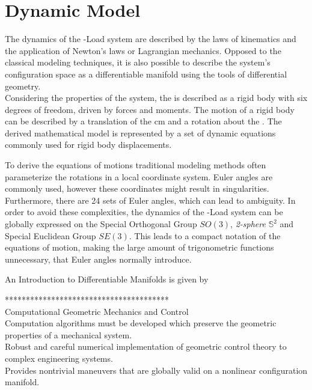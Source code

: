 \chapter{Dynamic Model} \label{ch:model}



The dynamics of the -Load system are described by the laws of kinematics and the application of Newton's laws or Lagrangian mechanics. Opposed to the classical modeling techniques, it is also possible to describe the system's configuration space as a differentiable manifold using the tools of differential geometry. \\

Considering the properties of the system, the  is described as a rigid body with six degrees of freedom, driven by forces and moments. The motion of a rigid body can be described by a translation of the \acf{cm} and a rotation about the . The derived mathematical model is represented by a set of dynamic equations commonly used for rigid body displacements. 

To derive the equations of motions traditional modeling methods often parameterize the rotations in a local coordinate system. Euler angles are commonly used, however these coordinates might result in singularities. Furthermore, there are 24 sets of Euler angles, which can lead to ambiguity. In order to avoid these complexities, the dynamics of the -Load system can be globally expressed on the Special Orthogonal Group $SO(3)$, \textit{2-sphere} $ \mathbb{S}^2 $ and Special Euclidean Group $ SE(3) $. This leads to a compact notation of the equations of motion, making the large amount of trigonometric functions unnecessary, that Euler angles normally introduce.

An Introduction to Differentiable Manifolds is given by \cite{Boothby2003}

\cite{Bullo2005}
\cite{Jurdjevic1997}


***************************************\\
Computational Geometric Mechanics and Control\\
Computation algorithms must be developed which preserve the geometric properties of a mechanical system.\\
Robust and careful numerical implementation of geometric control theory to complex engineering systems.\\
Provides nontrivial maneuvers that are globally valid on a nonlinear configuration manifold.

